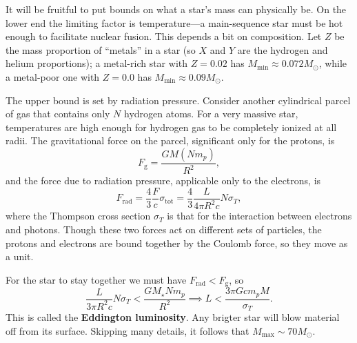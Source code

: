 \documentclass[../a062main.tex]{subfiles}
\begin{document}
It will be fruitful to put bounds on what a star's mass can physically be.
On the lower end the limiting factor is temperature---a main-sequence star must be hot enough to facilitate nuclear fusion.
This depends a bit on composition.
Let $Z$ be the mass proportion of ``metals'' in a star (so $X$ and $Y$ are the hydrogen and helium proportions); a metal-rich star with $Z = 0.02$ has $M_\textrm{min} \approx 0.072M_\odot$, while a metal-poor one with $Z = 0.0$ has $M_\textrm{min} \approx 0.09M_\odot$.

The upper bound is set by radiation pressure.
Consider another cylindrical parcel of gas that contains only $N$ hydrogen atoms.
For a very massive star, temperatures are high enough for hydrogen gas to be completely ionized at all radii.
The gravitational force on the parcel, significant only for the protons, is
\[ F_\textrm{g} = \frac{GM(Nm_p)}{R^2}, \]
and the force due to radiation pressure, applicable only to the electrons, is
\[ F_\textrm{rad} = \frac{4}{3} \frac{F}{c} \sigma_\textrm{tot} = \frac{4}{3} \frac{L}{4\pi R^2 c} N \sigma_T, \]
where the Thompson cross section $\sigma_T$ is that for the interaction between electrons and photons.
Though these two forces act on different sets of particles, the protons and electrons are bound together by the Coulomb force, so they move as a unit.

For the star to stay together we must have $F_\textrm{rad} < F_\textrm{g}$, so
\[ \frac{L}{3 \pi R^2 c} N\sigma_T < \frac{GM_\star N m_p}{R^2} \implies L < \frac{3\pi G c m_pM}{\sigma_T}. \]
This is called the \textbf{Eddington luminosity}.
Any brigter star will blow material off from its surface.
Skipping many details, it follows that $M_\textrm{max} \sim 70M_\odot$.
\end{document}
